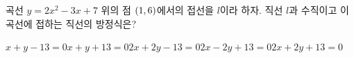 곡선 $y=2x^2-3x+7$ 위의 점 $(1{,}\mkern3mu\mathopen{}6)$에서의 접선을 $l$이라 하자. 직선 $l$과 수직이고 이 곡선에 접하는 직선의 방정식은?
\begin{choicesii}{$x+y-13=0$}{$x+y+13=0$}{$2x+2y-13=0$}{$2x-2y+13=0$}{$2x+2y+13=0$}\end{choicesii}
